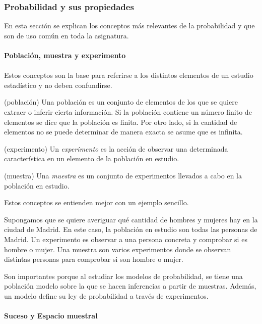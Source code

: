 \subsubsection{Probabilidad y sus propiedades}
En esta sección se explican los conceptos más relevantes de la probabilidad y que son de uso común en toda la asignatura.\\\\
\textbf{Población, muestra y experimento}\\\\
Estos conceptos son la base para referirse a los distintos elementos de un estudio estadístico y no deben confundirse.
\begin{definition}(población)
Una población es un conjunto de elementos de los que se quiere extraer o inferir cierta información. Si la población contiene un número finito de elementos se dice que la población es finita. Por otro lado, si la cantidad de elementos no se puede determinar de manera exacta se asume que es infinita.
	\label{def:población}
\end{definition}
\begin{definition}(experimento)
Un \textit{experimento} es la acción de observar una determinada característica en un elemento de la población en estudio.
	\label{def:experimento}
\end{definition}
\begin{definition}(muestra)
Una \textit{muestra} es un conjunto de experimentos llevados a cabo en la población en estudio.
	\label{def:muestra}
\end{definition}
Estos conceptos se entienden mejor con un ejemplo sencillo.
\begin{example}
Supongamos que se quiere averiguar qué cantidad de hombres y mujeres hay en la ciudad de Madrid. En este caso, la población en estudio son todas las personas de Madrid. Un experimento es observar a una persona concreta y comprobar si es hombre o mujer. Una muestra son varios experimentos donde se observan distintas personas para comprobar si son hombre o mujer.
	\label{ex: población}
\end{example}
Son importantes porque al estudiar los modelos de probabilidad, se tiene una población modelo sobre la que se hacen inferencias a partir de muestras. Además, un modelo define su ley de probabilidad a través de experimentos.
\\\\\textbf{Suceso y Espacio muestral}\\\\
